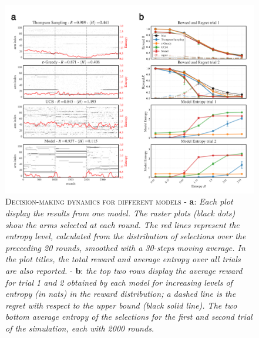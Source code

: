 \begin{figure}[H]
    \centering
    \includegraphics[width=1.0\textwidth]{figures/entropy_main_plot.png}
    \caption{\textsc{Decision-making dynamics for different models} - \textbf{a}: \textit{Each plot display the results from one model. The raster plots (black dots) show the arms selected at each round.
The red lines represent the entropy level, calculated from the distribution of selections over the preceeding 20 rounds, smoothed with a 30-steps moving average. In the plot titles, the total reward and average entropy over all trials are also reported.}
 - \textbf{b}: \textit{the top two rows display  the average reward for trial 1 and 2 obtained by each model for increasing levels of entropy (in nats) in the reward distribution; a dashed line is the regret with respect to the upper bound (black solid line). The two bottom average entropy of the selections for the first and second trial of the simulation, each with 2000 rounds.}}
    \label{fig:entropy_fig1}
\end{figure}



